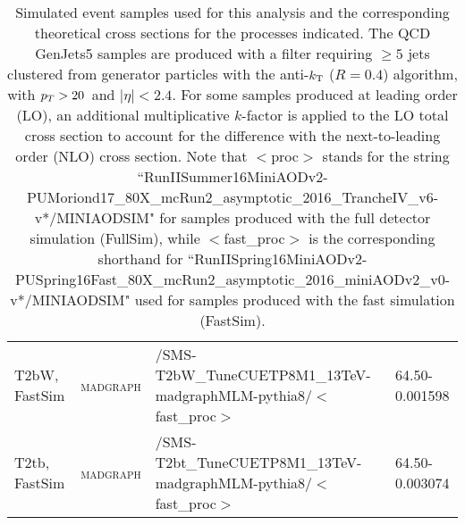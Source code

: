 \begin{table}[!htp]
\begin{center}
{\begin{tabular}{|l|l|l|l|}
T2bW, FastSim & \textsc{madgraph} & /SMS-T2bW\_TuneCUETP8M1\_13TeV-madgraphMLM-pythia8/$<$fast\_proc$>$ & 64.50-0.001598 \\
T2tb, FastSim & \textsc{madgraph} & /SMS-T2bt\_TuneCUETP8M1\_13TeV-madgraphMLM-pythia8/$<$fast\_proc$>$ & 64.50-0.003074 \\
\hline
\end{tabular}
}
\end{center}
\caption{\label{tab:samples}Simulated event samples used for this analysis and the corresponding theoretical cross sections for the processes indicated. The QCD GenJets5 samples are produced with a filter requiring $\geq 5$ jets clustered from generator particles with the anti-$k_{\rm T}$ ($R=0.4$) algorithm, with $p_{T} > 20$~\GeV and $|\eta| < 2.4$. For some samples produced at leading order (LO), an additional multiplicative $k$-factor is applied to the LO total cross section to account for the difference with the next-to-leading order (NLO) cross section. Note that $<$proc$>$ stands for the string ``RunIISummer16MiniAODv2-PUMoriond17\_80X\_mcRun2\_asymptotic\_2016\_TrancheIV\_v6-v*/MINIAODSIM" for samples produced with the full detector simulation (FullSim), while $<$fast\_proc$>$ is the corresponding shorthand for ``RunIISpring16MiniAODv2-PUSpring16Fast\_80X\_mcRun2\_asymptotic\_2016\_miniAODv2\_v0-v*/MINIAODSIM" used for samples produced with the fast simulation (FastSim).}
\end{table}
